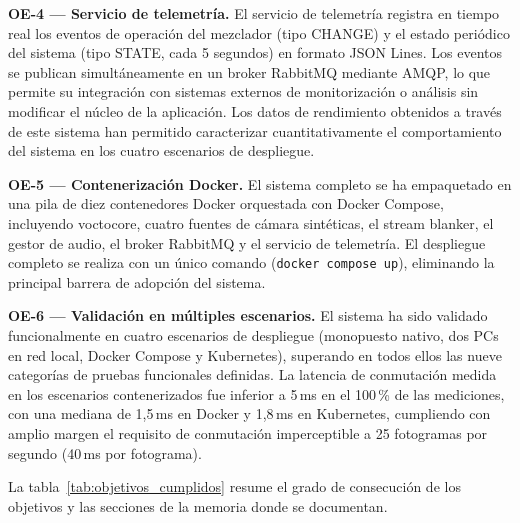\vspace{0.2cm}
\noindent\textbf{OE-4 — Servicio de telemetría.}
El servicio de telemetría registra en tiempo real los eventos de operación del mezclador
(tipo CHANGE) y el estado periódico del sistema (tipo STATE, cada 5 segundos) en
formato JSON Lines. Los eventos se publican simultáneamente en un broker RabbitMQ
mediante AMQP, lo que permite su integración con sistemas externos de monitorización
o análisis sin modificar el núcleo de la aplicación. Los datos de rendimiento
obtenidos a través de este sistema han permitido caracterizar cuantitativamente el
comportamiento del sistema en los cuatro escenarios de despliegue.

\vspace{0.2cm}
\noindent\textbf{OE-5 — Contenerización Docker.}
El sistema completo se ha empaquetado en una pila de diez contenedores Docker orquestada
con Docker Compose, incluyendo voctocore, cuatro fuentes de cámara sintéticas, el stream
blanker, el gestor de audio, el broker RabbitMQ y el servicio de telemetría. El despliegue
completo se realiza con un único comando (\texttt{docker compose up}), eliminando la
principal barrera de adopción del sistema.

\vspace{0.2cm}
\noindent\textbf{OE-6 — Validación en múltiples escenarios.}
El sistema ha sido validado funcionalmente en cuatro escenarios de despliegue
(monopuesto nativo, dos PCs en red local, Docker Compose y Kubernetes), superando
en todos ellos las nueve categorías de pruebas funcionales definidas. La latencia
de conmutación medida en los escenarios contenerizados fue inferior a 5\,ms en
el 100\,\% de las mediciones, con una mediana de 1{,}5\,ms en Docker y 1{,}8\,ms
en Kubernetes, cumpliendo con amplio margen el requisito de conmutación
imperceptible a 25 fotogramas por segundo (40\,ms por fotograma).

\vspace{0.4cm}
La tabla~\ref{tab:objetivos_cumplidos} resume el grado de consecución de los objetivos
y las secciones de la memoria donde se documentan.

